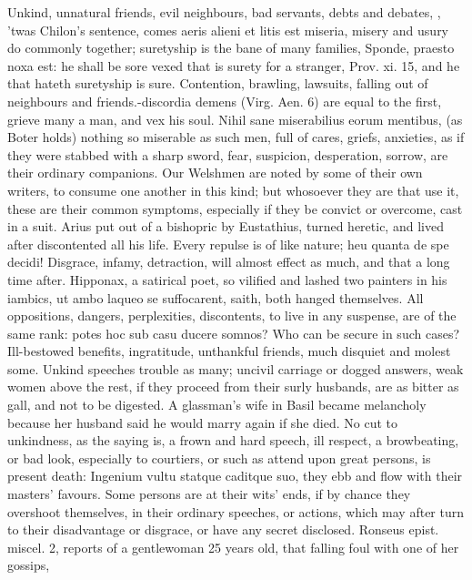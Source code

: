 {{Unkind, unnatural friends, evil neighbours, bad servants, debts and
debates, \etc{}, 'twas Chilon's sentence, comes aeris alieni et litis est
miseria, misery and usury do commonly together; suretyship is the bane
of many families, Sponde, praesto noxa est: he shall be sore vexed that
is surety for a stranger, Prov. xi. 15, and he that hateth suretyship
is sure. Contention, brawling, lawsuits, falling out of neighbours and
friends.-discordia demens (Virg. Aen. 6) are equal to the first,
grieve many a man, and vex his soul. Nihil sane miserabilius eorum
mentibus, (as Boter holds) nothing so miserable as such men, full
of cares, griefs, anxieties, as if they were stabbed with a sharp
sword, fear, suspicion, desperation, sorrow, are their ordinary
companions. Our Welshmen are noted by some of their own writers,
to consume one another in this kind; but whosoever they are that use
it, these are their common symptoms, especially if they be convict or
overcome, cast in a suit. Arius put out of a bishopric by
Eustathius, turned heretic, and lived after discontented all his life.
Every repulse is of like nature; heu quanta de spe decidi!
Disgrace, infamy, detraction, will almost effect as much, and that a
long time after. Hipponax, a satirical poet, so vilified and lashed two
painters in his iambics, ut ambo laqueo se suffocarent, \Pliny{}
saith, both hanged themselves. All oppositions, dangers, perplexities,
discontents, to live in any suspense, are of the same rank: potes
hoc sub casu ducere somnos? Who can be secure in such cases?
Ill-bestowed benefits, ingratitude, unthankful friends, much disquiet
and molest some. Unkind speeches trouble as many; uncivil carriage or
dogged answers, weak women above the rest, if they proceed from their
surly husbands, are as bitter as gall, and not to be digested. A
glassman's wife in Basil became melancholy because her husband said he
would marry again if she died. No cut to unkindness, as the saying is,
a frown and hard speech, ill respect, a browbeating, or bad look,
especially to courtiers, or such as attend upon great persons, is
present death: Ingenium vultu statque caditque suo, they ebb and flow
with their masters' favours. Some persons are at their wits' ends, if
by chance they overshoot themselves, in their ordinary speeches, or
actions, which may after turn to their disadvantage or disgrace, or
have any secret disclosed. Ronseus epist. miscel. 2, reports of a
gentlewoman 25 years old, that falling foul with one of her gossips,
}}
